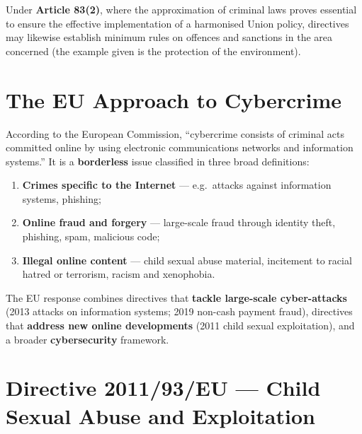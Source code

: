 \documentclass[11pt,a4paper,openany]{report}
\theoremstyle{definition}
\theoremstyle{plain}
\theoremstyle{remark}
\begin{document}
Under \textbf{Article 83(2)}, where the approximation of criminal laws proves essential to ensure the effective implementation of a harmonised Union policy, directives may likewise establish minimum rules on offences and sanctions in the area concerned (the example given is the protection of the environment).

\section{The EU Approach to Cybercrime}

According to the European Commission, ``cybercrime consists of criminal acts committed online by using electronic communications networks and information systems.'' It is a \textbf{borderless} issue classified in three broad definitions:
\begin{enumerate}
    \item \textbf{Crimes specific to the Internet} --- e.g.\ attacks against information systems, phishing;
    \item \textbf{Online fraud and forgery} --- large-scale fraud through identity theft, phishing, spam, malicious code;
    \item \textbf{Illegal online content} --- child sexual abuse material, incitement to racial hatred or terrorism, racism and xenophobia.
\end{enumerate}
The EU response combines directives that \textbf{tackle large-scale cyber-attacks} (2013 attacks on information systems; 2019 non-cash payment fraud), directives that \textbf{address new online developments} (2011 child sexual exploitation), and a broader \textbf{cybersecurity} framework.

\section{Directive 2011/93/EU --- Child Sexual Abuse and Exploitation}
\end{document}

